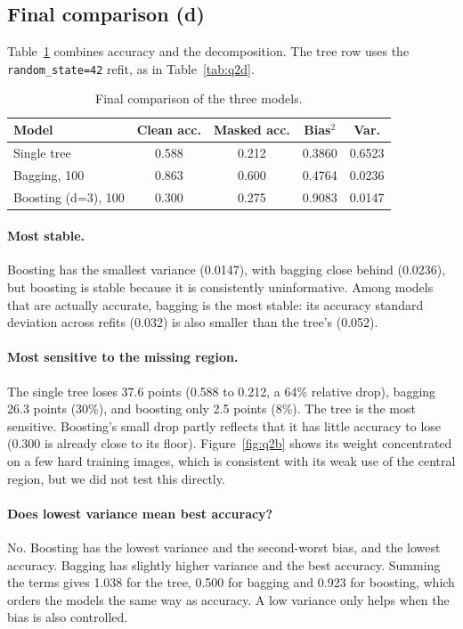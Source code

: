 \documentclass[10pt,twocolumn,letterpaper]{article}
\begin{document}
\subsection{Final comparison (d)}
Table~\ref{tab:final} combines accuracy and the decomposition. The tree row uses the \texttt{random\_state=42} refit, as in Table~\ref{tab:q2d}.

\begin{table}[t]
\centering\small
\setlength{\tabcolsep}{3pt}
\begin{tabular}{@{}lcccc@{}}
\toprule
Model & Clean acc. & Masked acc. & Bias$^2$ & Var.\\
\midrule
Single tree & 0.588 & 0.212 & 0.3860 & 0.6523\\
Bagging, 100 & 0.863 & 0.600 & 0.4764 & 0.0236\\
Boosting (d=3), 100 & 0.300 & 0.275 & 0.9083 & 0.0147\\
\bottomrule
\end{tabular}
\caption{Final comparison of the three models.}
\label{tab:final}
\end{table}

\paragraph{Most stable.}
Boosting has the smallest variance (0.0147), with bagging close behind (0.0236), but boosting is stable because it is consistently uninformative. Among models that are actually accurate, bagging is the most stable: its accuracy standard deviation across refits (0.032) is also smaller than the tree's (0.052).

\paragraph{Most sensitive to the missing region.}
The single tree loses 37.6 points (0.588 to 0.212, a 64\% relative drop), bagging 26.3 points (30\%), and boosting only 2.5 points (8\%). The tree is the most sensitive. Boosting's small drop partly reflects that it has little accuracy to lose (0.300 is already close to its floor). Figure~\ref{fig:q2b} shows its weight concentrated on a few hard training images, which is consistent with its weak use of the central region, but we did not test this directly.

\paragraph{Does lowest variance mean best accuracy?}
No. Boosting has the lowest variance and the second-worst bias, and the lowest accuracy. Bagging has slightly higher variance and the best accuracy. Summing the terms gives 1.038 for the tree, 0.500 for bagging and 0.923 for boosting, which orders the models the same way as accuracy. A low variance only helps when the bias is also controlled.
\end{document}

